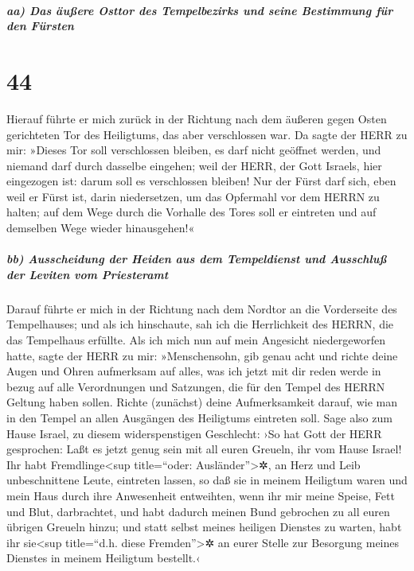 \hypertarget{aa-das-uxe4uuxdfere-osttor-des-tempelbezirks-und-seine-bestimmung-fuxfcr-den-fuxfcrsten}{%
\subparagraph{aa) Das äußere Osttor des Tempelbezirks und seine
Bestimmung für den
Fürsten}\label{aa-das-uxe4uuxdfere-osttor-des-tempelbezirks-und-seine-bestimmung-fuxfcr-den-fuxfcrsten}}

\hypertarget{section-43}{%
\section{44}\label{section-43}}

Hierauf führte er mich zurück in der Richtung nach dem
äußeren gegen Osten gerichteten Tor des Heiligtums, das aber
verschlossen war. Da sagte der HERR zu mir: »Dieses Tor
soll verschlossen bleiben, es darf nicht geöffnet werden, und niemand
darf durch dasselbe eingehen; weil der HERR, der Gott Israels, hier
eingezogen ist: darum soll es verschlossen bleiben! Nur
der Fürst darf sich, eben weil er Fürst ist, darin niedersetzen, um das
Opfermahl vor dem HERRN zu halten; auf dem Wege durch die Vorhalle des
Tores soll er eintreten und auf demselben Wege wieder hinausgehen!«

\hypertarget{bb-ausscheidung-der-heiden-aus-dem-tempeldienst-und-ausschluuxdf-der-leviten-vom-priesteramt}{%
\subparagraph{bb) Ausscheidung der Heiden aus dem Tempeldienst und
Ausschluß der Leviten vom
Priesteramt}\label{bb-ausscheidung-der-heiden-aus-dem-tempeldienst-und-ausschluuxdf-der-leviten-vom-priesteramt}}

Darauf führte er mich in der Richtung nach dem Nordtor an
die Vorderseite des Tempelhauses; und als ich hinschaute, sah ich die
Herrlichkeit des HERRN, die das Tempelhaus erfüllte. Als ich mich nun
auf mein Angesicht niedergeworfen hatte, sagte der HERR zu
mir: »Menschensohn, gib genau acht und richte deine Augen und Ohren
aufmerksam auf alles, was ich jetzt mit dir reden werde in bezug auf
alle Verordnungen und Satzungen, die für den Tempel des HERRN Geltung
haben sollen. Richte (zunächst) deine Aufmerksamkeit darauf, wie man in
den Tempel an allen Ausgängen des Heiligtums eintreten soll.
Sage also zum Hause Israel, zu diesem widerspenstigen
Geschlecht: ›So hat Gott der HERR gesprochen: Laßt es jetzt genug sein
mit all euren Greueln, ihr vom Hause Israel! Ihr habt
Fremdlinge\textless sup title=``oder: Ausländer''\textgreater✲, an Herz
und Leib unbeschnittene Leute, eintreten lassen, so daß sie in meinem
Heiligtum waren und mein Haus durch ihre Anwesenheit entweihten, wenn
ihr mir meine Speise, Fett und Blut, darbrachtet, und habt dadurch
meinen Bund gebrochen zu all euren übrigen Greueln hinzu;
und statt selbst meines heiligen Dienstes zu warten, habt
ihr sie\textless sup title=``d.h. diese Fremden''\textgreater✲ an eurer
Stelle zur Besorgung meines Dienstes in meinem Heiligtum bestellt.‹


